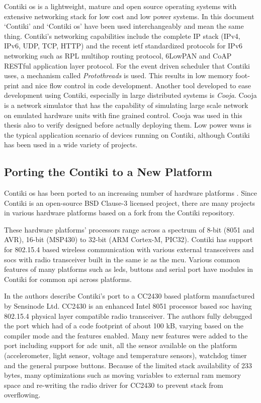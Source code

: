Contiki \gls{os} is a lightweight, mature and open source operating systems with extensive networking stack for low cost and low power systems\cite{Contiki}. In this document `Contiki' and `Contiki \gls{os}' have been used interchangeably and mean the same thing. Contiki's networking capabilities include the complete IP stack (IPv4, IPv6, UDP, TCP, HTTP) and the recent \gls{ietf} standardized protocols for IPv6 networking such as RPL multihop routing protocol, 6LowPAN and CoAP RESTful application layer protocol. For the event driven scheduler that Contiki uses, a mechanism called \emph{Protothreads} is used. This results in low memory foot-print and nice flow control in code development. Another tool developed to ease development using Contiki, especially in large distributed systems is \emph{Cooja}. Cooja is a network simulator that has the capability of simulating large scale network on emulated hardware units with fine grained control. Cooja was used in this thesis also to verify designed before actually deploying them. Low power \glspl{wsn} is the typical application scenario of devices running on Contiki, although Contiki has been used in a wide variety of projects.



\subsection{Porting the Contiki to a New Platform} \label{2Porting}
Contiki \gls{os} has been ported to an increasing number of hardware platforms \cite{contikiHw}. Since Contiki is an open-source BSD Clause-3 licensed project, there are many projects in various hardware platforms based on a fork from the Contiki repository.

These hardware platforms' processors range across a spectrum of 8-bit (8051 and AVR), 16-bit (MSP430) to 32-bit (ARM Cortex-M, PIC32). Contiki has support for 802.15.4 based wireless communication with various external transceivers and \glspl{soc} with radio transceiver built in the same \gls{ic} as the \gls{mcu}. Various common features of many platforms such as \glspl{led}, buttons and serial port have modules in Contiki for common \gls{api} across platforms.

In \cite{Oikonomou2011} the authors describe Contiki's port to a CC2430 based platform manufactured by Sensinode Ltd. CC2430 is an enhanced Intel 8051 processor based \gls{soc} having 802.15.4 physical layer compatible radio transceiver. The authors fully debugged the port which had of a code footprint of about 100 kB, varying based on the compiler mode and the features enabled. Many new features were added to the port including support for \gls{adc} unit, all the sensor available on the platform (accelerometer, light sensor, voltage and temperature sensors), watchdog timer and the general purpose buttons. Because of the limited stack availability of 233 bytes, many optimizations such as moving variables to external \gls{ram} memory space and re-writing the radio driver for CC2430 to prevent stack from overflowing.

